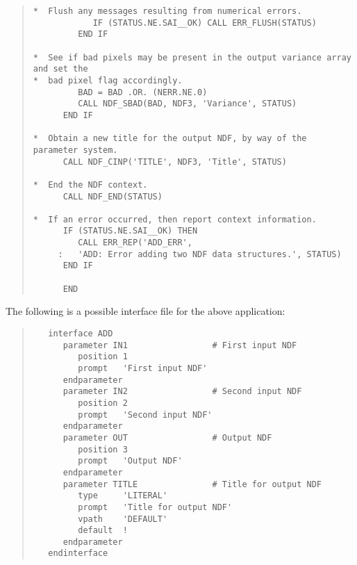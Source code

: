 \begin{quote}
\begin{small}
\begin{verbatim}
*  Flush any messages resulting from numerical errors.
            IF (STATUS.NE.SAI__OK) CALL ERR_FLUSH(STATUS)
         END IF

*  See if bad pixels may be present in the output variance array and set the
*  bad pixel flag accordingly.
         BAD = BAD .OR. (NERR.NE.0)
         CALL NDF_SBAD(BAD, NDF3, 'Variance', STATUS)
      END IF

*  Obtain a new title for the output NDF, by way of the parameter system.
      CALL NDF_CINP('TITLE', NDF3, 'Title', STATUS)

*  End the NDF context.
      CALL NDF_END(STATUS)

*  If an error occurred, then report context information.
      IF (STATUS.NE.SAI__OK) THEN
         CALL ERR_REP('ADD_ERR',
     :   'ADD: Error adding two NDF data structures.', STATUS)
      END IF

      END
\end{verbatim}
\end{small}

\end{quote}

The following is a possible interface file for the above application:

\begin{quote}
\begin{small}
\begin{verbatim}
   interface ADD
      parameter IN1                 # First input NDF
         position 1
         prompt   'First input NDF'
      endparameter
      parameter IN2                 # Second input NDF
         position 2
         prompt   'Second input NDF'
      endparameter
      parameter OUT                 # Output NDF
         position 3
         prompt   'Output NDF'
      endparameter
      parameter TITLE               # Title for output NDF
         type     'LITERAL'
         prompt   'Title for output NDF'
         vpath    'DEFAULT'
         default  !
      endparameter
   endinterface
\end{verbatim}
\end{small}
\end{quote}
